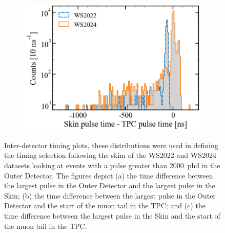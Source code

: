 \begin{figure}[htbp]
\begin{subfigure}{0.5\textwidth}
    \includegraphics[width=\textwidth]{figures/Muons/Skin-TPC_timing.pdf}
    \caption{}
    \label{fig:Muons/Skin-TPC}
\end{subfigure}
\caption{Inter-detector timing plots, these distributions were used in defining the timing selection following the skim of the WS2022 and WS2024 datasets looking at events with a pulse greater than 2000~phd in the Outer Detector. The figures depict (a) the time difference between the largest pulse in the Outer Detector and the largest pulse in the Skin; (b) the time difference between the largest pulse in the Outer Detector and the start of the muon tail in the TPC; and (c) the time difference between the largest pulse in the Skin and the start of the muon tail in the TPC.}
\label{fig:Muons/timing_plots}
\end{figure}

